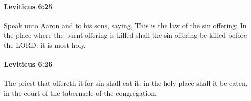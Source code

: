 		\paragraph{Leviticus 6:25} %
			\label{LEVITICUS-6-25}

			Speak unto Aaron and to his sons, saying, This is the law of the sin offering: In the place where the burnt offering is killed shall the sin offering be killed before the LORD: it is most holy.


		\paragraph{Leviticus 6:26} %
			\label{LEVITICUS-6-26}

			The priest that offereth it for sin shall eat it: in the holy place shall it be eaten, in the court of the tabernacle of the congregation.


